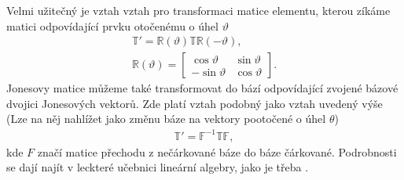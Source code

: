 Velmi užitečný je vztah vztah pro transformaci matice elementu, kterou zíkáme matici odpovídající prvku otočenému o úhel $\vartheta$
\begin{eqnarray}
\mathbb{T}'=\mathbb{R}(\vartheta)\mathbb{TR}(-\vartheta), \\
\mathbb{R}(\vartheta) = \begin{bmatrix} \cos\vartheta & \sin\vartheta \\ -\sin\vartheta & \cos\vartheta \end{bmatrix}.
\end{eqnarray}
Jonesovy matice můžeme také transformovat do bází odpovídající zvojené bázové dvojici Jonesových vektorů. Zde platí vztah podobný jako vztah uvedený výše (Lze na něj nahlížet jako změnu báze na vektory pootočené o úhel $\theta$)
\begin{eqnarray}
\mathbb{T}'=\mathbb{F}^{-1}\mathbb{TF},
\end{eqnarray}
kde $F$ značí matice přechodu z nečárkované báze do báze čárkované. Podrobnosti se dají najít v leckteré učebnici lineární algebry, jako je třeba \cite{Smid}.


